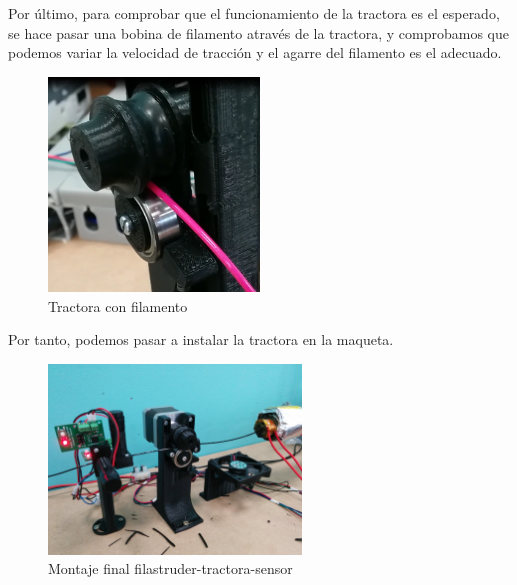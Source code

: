 Por último, para comprobar que el funcionamiento de la tractora es el esperado, se hace pasar una bobina de filamento através de la tractora, y comprobamos que podemos variar la velocidad de tracción y el agarre del filamento es el adecuado.

	\begin{figure}[H]
            \centering
            \includegraphics[width=0.5\textwidth]{images/producciones/tractora/final.png}
            \caption{Tractora con filamento}
            \label{fig:tractora_fila}
    \end{figure}


Por tanto, podemos pasar a instalar la tractora en la maqueta.

	\begin{figure}[H]
            \centering
            \includegraphics[width=0.6\textwidth]{images/producciones/tractora/IMG_20150709_130326.jpg}
            \caption{Montaje final filastruder-tractora-sensor}
            \label{fig:montaje_final}
    \end{figure}

